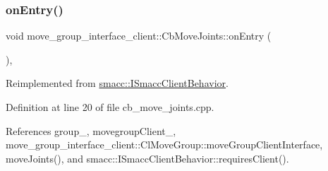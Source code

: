 \subsubsection{\texorpdfstring{on\+Entry()}{onEntry()}}
{\footnotesize\ttfamily void move\+\_\+group\+\_\+interface\+\_\+client\+::\+Cb\+Move\+Joints\+::on\+Entry (\begin{DoxyParamCaption}{ }\end{DoxyParamCaption})\hspace{0.3cm}{\ttfamily [override]}, {\ttfamily [virtual]}}



Reimplemented from \hyperlink{classsmacc_1_1ISmaccClientBehavior_a3ec24a839087c550e1d62a81e48cf530}{smacc\+::\+I\+Smacc\+Client\+Behavior}.



Definition at line 20 of file cb\+\_\+move\+\_\+joints.\+cpp.



References group\+\_\+, movegroup\+Client\+\_\+, move\+\_\+group\+\_\+interface\+\_\+client\+::\+Cl\+Move\+Group\+::move\+Group\+Client\+Interface, move\+Joints(), and smacc\+::\+I\+Smacc\+Client\+Behavior\+::requires\+Client().


